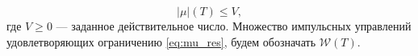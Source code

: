 \begin{equation}
  \label{eq:mu_res}
  |\mu|(T) \le V,
\end{equation}
где $V \ge 0$ --- заданное действительное число. Множество импульсных
управлений удовлетворяющих ограничению \eqref{eq:mu_res}, будем
обозначать $\mathcal{W}(T)$.






